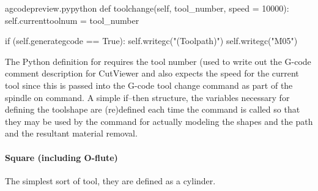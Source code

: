 \documentclass{ltxdoc}
\begin{document}

\lstset{firstnumber=\thegcpy}
\begin{writecode}{a}{gcodepreview.py}{python}
    def toolchange(self, tool_number, speed = 10000):
        self.currenttoolnum = tool_number

        if (self.generategcode == True):
            self.writegc("(Toolpath)")
            self.writegc("M05")

\end{writecode}
\addtocounter{gcpy}{7}

The Python definition for  requires the tool number (used to write out the G-code comment description for CutViewer and also expects the speed for the current tool since this is passed into the G-code tool change command as part of the spindle on command. A simple if--then structure, the variables necessary for defining the toolshape are (re)defined each time the command is called so that they may be used by the command  for actually modeling the shapes and the path and the resultant material removal.

\paragraph{Square (including O-flute)}

The simplest sort of tool, they are defined as a cylinder.

\end{document}
